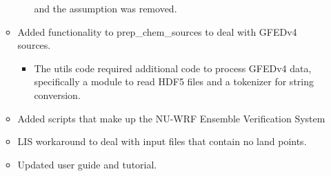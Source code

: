 \begin{itemize}
\begin{itemize}
\begin{itemize}
   and the assumption was removed.
  \end{itemize}
\item  Added functionality to prep\_chem\_sources to deal with GFEDv4 sources.
  \begin{itemize}
 \item The utils code required additional code to process GFEDv4 data, specifically a
 module to read HDF5 files and a tokenizer for string conversion.
  \end{itemize}
\item  Added scripts that make up the NU-WRF Ensemble Verification System
\item  LIS workaround to deal with input files that contain no land points.
\item  Updated user guide and tutorial.

  \end{itemize}


\end{itemize}
